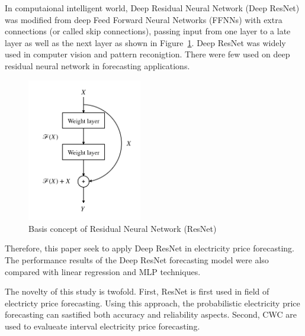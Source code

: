 \documentclass[review]{elsarticle}
\begin{document}
    In computaional intelligent world, Deep Residual Neural Network (Deep ResNet) was modified from deep Feed Forward Neural Networks (FFNNs) with extra connections (or called skip connections), passing input from one layer to a late layer as well as the next layer as shown in Figure~\ref{Fig:Basic_DRNN}.
    Deep ResNet was widely used in computer vision and pattern reconigtion.
    There were few used on deep residual neural network in forecasting applications.

    \begin{figure}[H]
      \centering
      \includegraphics[width=5cm]{basic_DRNN}
      \caption{Basis concept of Residual Neural Network (ResNet)}
      \label{Fig:Basic_DRNN}
    \end{figure}


    Therefore, this paper seek to apply Deep ResNet in electricity price forecasting.
    The performance results of the Deep ResNet forecasting model were also compared with linear regression and MLP techniques.

    The novelty of this study is twofold.
    First, ResNet is first used in field of electricty price forecasting. Using this approach, the probabilistic electricity price forecasting can sastified both accuracy and reliability aspects.
    Second, CWC are used to evalueate interval electricity price forecasting.
\end{document}
